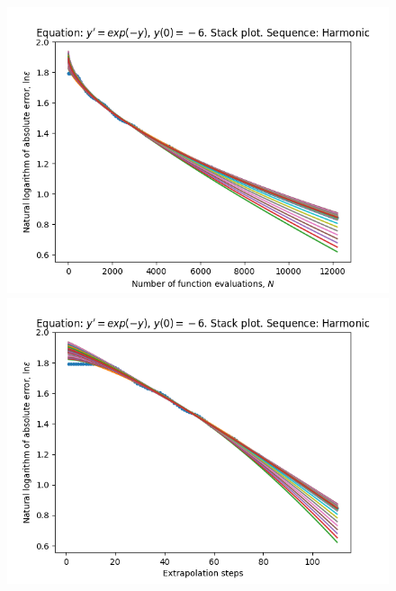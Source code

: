 \begin{figure}[H]
\centering
\begin{minipage}{0.45\textwidth}
\centering
\includegraphics[scale=0.45]{../results/emr_plots/ln_em6_hp_harmonic_stack.png}
\end{minipage}
\begin{minipage}{0.45\textwidth}
\centering
\includegraphics[scale=0.45]{../results/emr_plots/ln_em6_hp_harmonic_steps_stack.png}
\end{minipage}
\end{figure}

